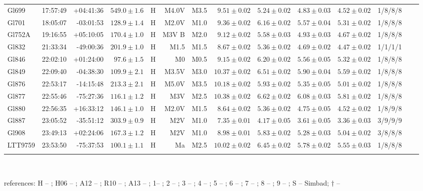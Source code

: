 \documentclass{aa}
\begin{document}
\begin{table}[h!]
{\begin{tabular}{ l r r r c r r r r r r r r r}
Gl699 & 17:57:49 & +04:41:36 & $549.0 \pm  1.6$ & H & M4.0V & M3.5 &  $9.51 \pm 0.02$ & $5.24 \pm 0.02$ & $4.83 \pm 0.03$ & $4.52 \pm 0.02$ & 1/8/8/8 \\
Gl701 & 18:05:07 & -03:01:53 & $128.9 \pm  1.4$ & H & M2.0V & M1.0 &  $9.36 \pm 0.02$ & $6.16 \pm 0.02$ & $5.57 \pm 0.04$ & $5.31 \pm 0.02$ & 1/8/8/8 \\
Gl752A & 19:16:55 & +05:10:05 & $170.4 \pm  1.0$ & H & M3V B & M2.0 &  $9.12 \pm 0.02$ & $5.58 \pm 0.03$ & $4.93 \pm 0.03$ & $4.67 \pm 0.02$ & 1/8/8/8 \\
Gl832 & 21:33:34 & -49:00:36 & $201.9 \pm  1.0$ & H & M1.5 & M1.5 &  $8.67 \pm 0.02$ & $5.36 \pm 0.02$ & $4.69 \pm 0.02$ & $4.47 \pm 0.02$ & 1/1/1/1 \\
Gl846 & 22:02:10 & +01:24:00 & $97.6 \pm  1.5$ & H & M0 & M0.5 &  $9.15 \pm 0.02$ & $6.20 \pm 0.02$ & $5.56 \pm 0.05$ & $5.32 \pm 0.02$ & 1/8/8/8 \\
Gl849 & 22:09:40 & -04:38:30 & $109.9 \pm  2.1$ & H & M3.5V & M3.0 &  $10.37 \pm 0.02$ & $6.51 \pm 0.02$ & $5.90 \pm 0.04$ & $5.59 \pm 0.02$ & 1/8/8/8 \\
Gl876 & 22:53:17 & -14:15:48 & $213.3 \pm  2.1$ & H & M5.0V & M3.5 &  $10.18 \pm 0.02$ & $5.93 \pm 0.02$ & $5.35 \pm 0.05$ & $5.01 \pm 0.02$ & 1/8/8/8 \\
Gl877 & 22:55:46 & -75:27:36 & $116.1 \pm  1.2$ & H & M3V & M2.5 &  $10.38 \pm 0.02$ & $6.62 \pm 0.02$ & $6.08 \pm 0.03$ & $5.81 \pm 0.02$ & 1/8/8/8 \\
Gl880 & 22:56:35 & +16:33:12 & $146.1 \pm  1.0$ & H & M2.0V & M1.5 &  $8.64 \pm 0.02$ & $5.36 \pm 0.02$ & $4.75 \pm 0.05$ & $4.52 \pm 0.02$ & 1/8/9/8 \\
Gl887 & 23:05:52 & -35:51:12 & $303.9 \pm  0.9$ & H & M2V & M1.0 &  $7.35 \pm 0.01$ & $4.17 \pm 0.05$ & $3.61 \pm 0.05$ & $3.36 \pm 0.03$ & 3/9/9/9 \\
Gl908 & 23:49:13 & +02:24:06 & $167.3 \pm  1.2$ & H & M2V & M1.0 &  $8.98 \pm 0.01$ & $5.83 \pm 0.02$ & $5.28 \pm 0.03$ & $5.04 \pm 0.02$ & 3/8/8/8 \\
LTT9759 & 23:53:50 & -75:37:53 & $100.1 \pm  1.1$ & H & Ma & M2.5 &  $10.02 \pm 0.02$ & $6.45 \pm 0.02$ & $5.78 \pm 0.02$ & $5.55 \pm 0.03$ & 1/8/8/8 \\
\\
\hline
\hline
\end{tabular}
}
{
\\
\raggedright{
references: H -- \citep{van-Leeuwen-2007}; H06 -- \citet{Henry-2006}; A12 -- \citet{Anglada-Escude-2012}; R10 -- \citet{Riedel-2010}; A13 -- \citet{Anglada-Escude-2013}; 1-- \citet{Koen-2010}; 2 -- \citet{Henden-2009,Henden-2012}; 3 -- \citet{Perryman-1997}; 4 -- \citet{Weis-1993}; 5 -- \citet{Laing-1989}; 6 -- \citet{Fabricius-2002}; 7 -- \citet{Dawson-1992}; 8 -- \citet{Skrutskie-2006}; 9 -- \citet{Leggett-1992}; S -- Simbad; $\dagger$ -- \citet{Hawley-1997} \\
}
}
\end{table}
\end{document}
